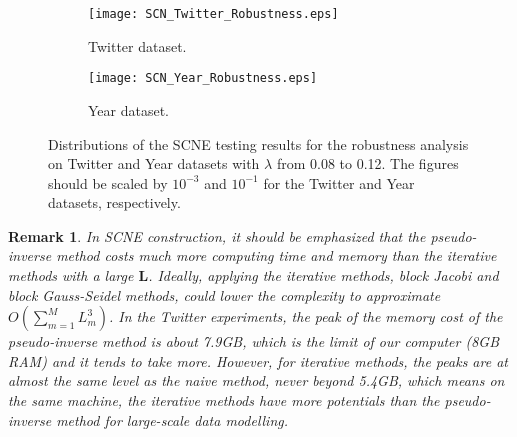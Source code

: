 \documentclass{article}
\newtheorem{remark}{Remark}
\begin{document}
\begin{figure}[H]
\centering
    \begin{subfigure}[b]{0.47\textwidth}
    \centering
        \texttt{[image: SCN\_Twitter\_Robustness.eps]}
        \caption{Twitter dataset.}
        \label{}    
    \end{subfigure}
    \begin{subfigure}[b]{0.47\textwidth}
    \centering
        \texttt{[image: SCN\_Year\_Robustness.eps]}
        \caption{Year dataset.}
        \label{} 
    \end{subfigure}          
\caption{Distributions of the SCNE testing results for the robustness analysis on Twitter and Year datasets with $\lambda$ from 0.08 to 0.12. The figures should be scaled by $10^{-3}$ and $10^{-1}$ for the Twitter and Year datasets, respectively.}
\label{Fig09}
\end{figure}
\begin{remark} 
In SCNE construction, it should be emphasized that the pseudo-inverse method costs much more computing time and memory than the iterative methods with a large $\bm{L}$.
Ideally, applying the iterative methods, block Jacobi and block Gauss-Seidel methods, could lower the complexity to approximate $O(\sum_{m=1}^{M} L_m^3)$.
In the Twitter experiments, the peak of the memory cost of the pseudo-inverse method is about 7.9GB, which is the limit of our computer (8GB RAM) and it tends to take more. 
However, for iterative methods, the peaks are at almost the same level as the naive method, never beyond 5.4GB, which means on the same machine, the iterative methods have more potentials than the pseudo-inverse method for large-scale data modelling.
\end{remark}  

\end{document}
